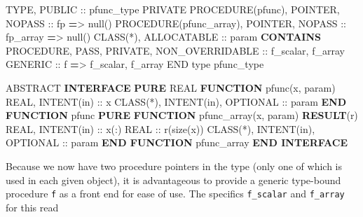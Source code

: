 \documentclass[
]{article}
\newenvironment{Shaded}{}{}
\newcommand{\DataTypeTok}[1]{\textcolor[rgb]{0.56,0.13,0.00}{#1}}
\newcommand{\FunctionTok}[1]{\textcolor[rgb]{0.02,0.16,0.49}{#1}}
\newcommand{\KeywordTok}[1]{\textcolor[rgb]{0.00,0.44,0.13}{\textbf{#1}}}
\newcommand{\NormalTok}[1]{#1}
\newcommand{\OperatorTok}[1]{\textcolor[rgb]{0.40,0.40,0.40}{#1}}
\begin{document}
\begin{Shaded}
\begin{Highlighting}[]
\DataTypeTok{TYPE}\NormalTok{, }\DataTypeTok{PUBLIC} \DataTypeTok{::}\NormalTok{ pfunc\_type}
   \DataTypeTok{PRIVATE}
   \DataTypeTok{PROCEDURE(pfunc)}\NormalTok{, }\DataTypeTok{POINTER}\NormalTok{, }\DataTypeTok{NOPASS} \DataTypeTok{::}\NormalTok{ fp }\KeywordTok{=}\OperatorTok{\textgreater{}}\NormalTok{ null()}
   \DataTypeTok{PROCEDURE(pfunc\_array)}\NormalTok{, }\DataTypeTok{POINTER}\NormalTok{, }\DataTypeTok{NOPASS} \DataTypeTok{::}\NormalTok{ fp\_array }\KeywordTok{=}\OperatorTok{\textgreater{}}\NormalTok{ null()}
   \DataTypeTok{CLASS(*)}\NormalTok{, }\DataTypeTok{ALLOCATABLE} \DataTypeTok{::}\NormalTok{ param}
\KeywordTok{CONTAINS}
   \DataTypeTok{PROCEDURE}\NormalTok{, }\DataTypeTok{PASS}\NormalTok{, }\DataTypeTok{PRIVATE}\NormalTok{, }\DataTypeTok{NON\_OVERRIDABLE} \DataTypeTok{::}\NormalTok{ f\_scalar, f\_array}
   \DataTypeTok{GENERIC} \DataTypeTok{::}\NormalTok{ f }\KeywordTok{=}\OperatorTok{\textgreater{}}\NormalTok{ f\_scalar, f\_array}
\DataTypeTok{END type}\NormalTok{ pfunc\_type}

\DataTypeTok{ABSTRACT} \KeywordTok{INTERFACE}
   \KeywordTok{PURE} \DataTypeTok{REAL} \KeywordTok{FUNCTION}\NormalTok{ pfunc(x, param)}
      \DataTypeTok{REAL}\NormalTok{, }\DataTypeTok{INTENT(in)} \DataTypeTok{::}\NormalTok{ x}
      \DataTypeTok{CLASS(*)}\NormalTok{, }\DataTypeTok{INTENT(in)}\NormalTok{, }\DataTypeTok{OPTIONAL} \DataTypeTok{::}\NormalTok{ param}
   \KeywordTok{END FUNCTION}\NormalTok{ pfunc}
   \KeywordTok{PURE} \KeywordTok{FUNCTION}\NormalTok{ pfunc\_array(x, param) }\KeywordTok{RESULT}\NormalTok{(r)}
      \DataTypeTok{REAL}\NormalTok{, }\DataTypeTok{INTENT(in)} \DataTypeTok{::}\NormalTok{ x(:)}
      \DataTypeTok{REAL} \DataTypeTok{::}\NormalTok{ r(}\FunctionTok{size}\NormalTok{(x))}
      \DataTypeTok{CLASS(*)}\NormalTok{, }\DataTypeTok{INTENT(in)}\NormalTok{, }\DataTypeTok{OPTIONAL} \DataTypeTok{::}\NormalTok{ param}
   \KeywordTok{END FUNCTION}\NormalTok{ pfunc\_array}
\KeywordTok{END INTERFACE}
\end{Highlighting}
\end{Shaded}

Because we now have two procedure pointers in the type (only one of
which is used in each given object), it is advantageous to provide a
generic type-bound procedure \texttt{f} as a front end for ease of use.
The specifics \texttt{f\_scalar} and \texttt{f\_array} for this read
\end{document}
